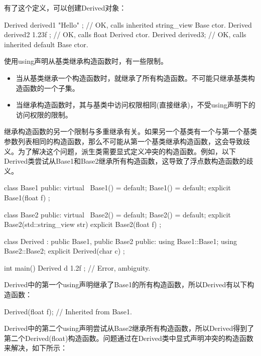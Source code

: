 有了这个定义，可以创建Derived对象：

\begin{cpp}
Derived derived1 { "Hello" }; // OK, calls inherited string_view Base ctor.
Derived derived2 { 1.23f }; // OK, calls float Derived ctor.
Derived derived3; // OK, calls inherited default Base ctor.
\end{cpp}

使用using声明从基类继承构造函数时，有一些限制。

\begin{itemize}
\item
当从基类继承一个构造函数时，就继承了所有构造函数。不可能只继承基类构造函数的一个子集。

\item
当继承构造函数时，其与基类中访问权限相同(直接继承)，不受using声明下的访问权限的限制。
\end{itemize}


继承构造函数的另一个限制与多重继承有关。如果另一个基类有一个与第一个基类参数列表相同的构造函数，那么不可能从第一个基类继承构造函数，这会导致歧义。为了解决这个问题，派生类需要显式定义冲突的构造函数。例如，以下Derived类尝试从Base1和Base2继承所有构造函数，这导致了浮点数构造函数的歧义。

\begin{cpp}
class Base1
{
    public:
        virtual ~Base1() = default;
        Base1() = default;
        explicit Base1(float f) {}
};

class Base2
{
    public:
        virtual ~Base2() = default;
        Base2() = default;
        explicit Base2(std::string_view str) {}
        explicit Base2(float f) {}
};

class Derived : public Base1, public Base2
{
    public:
        using Base1::Base1;
        using Base2::Base2;
        explicit Derived(char c) {}
};

int main()
{
    Derived d { 1.2f }; // Error, ambiguity.
}
\end{cpp}

Derived中的第一个using声明继承了Base1的所有构造函数，所以Derived有以下构造函数：

\begin{cpp}
Derived(float f); // Inherited from Base1.
\end{cpp}

Derived中的第二个using声明尝试从Base2继承所有构造函数，所以Derived得到了第二个Derived(float)构造函数。问题通过在Derived类中显式声明冲突的构造函数来解决，如下所示：

